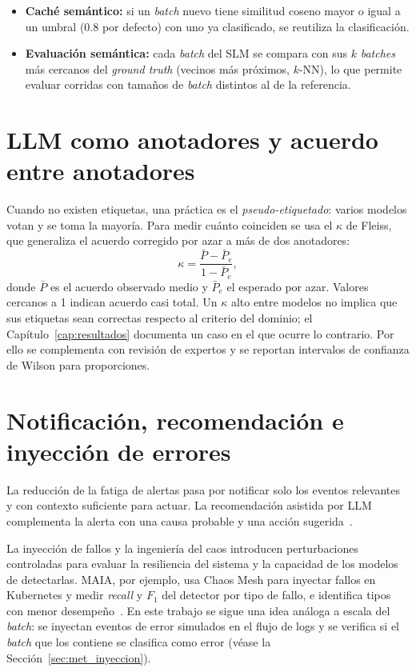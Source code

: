 \begin{itemize}
  \item \textbf{Caché semántico:} si un \textit{batch} nuevo tiene similitud coseno mayor o igual a un umbral (0.8 por defecto) con uno ya clasificado, se reutiliza la clasificación.
  \item \textbf{Evaluación semántica:} cada \textit{batch} del SLM se compara con sus $k$ \textit{batches} más cercanos del \textit{ground truth} (vecinos más próximos, $k$-NN), lo que permite evaluar corridas con tamaños de \textit{batch} distintos al de la referencia.
\end{itemize}

\section{LLM como anotadores y acuerdo entre anotadores}\label{sec:mt_anotacion}

Cuando no existen etiquetas, una práctica es el \textit{pseudo-etiquetado}: varios modelos votan y se toma la mayoría. Para medir cuánto coinciden se usa el $\kappa$ de Fleiss, que generaliza el acuerdo corregido por azar a más de dos anotadores:
\begin{equation}
\kappa = \frac{\bar{P} - \bar{P}_e}{1 - \bar{P}_e},
\end{equation}
donde $\bar{P}$ es el acuerdo observado medio y $\bar{P}_e$ el esperado por azar. Valores cercanos a 1 indican acuerdo casi total. %
Un $\kappa$ alto entre modelos no implica que sus etiquetas sean correctas respecto al criterio del dominio; el Capítulo~\ref{cap:resultados} documenta un caso en el que ocurre lo contrario. Por ello se complementa con revisión de expertos y se reportan intervalos de confianza de Wilson para proporciones.

\section{Notificación, recomendación e inyección de errores}\label{sec:mt_reaccion}

La reducción de la fatiga de alertas pasa por notificar solo los eventos relevantes y con contexto suficiente para actuar. La recomendación asistida por LLM complementa la alerta con una causa probable y una acción sugerida~\cite{pedroso2025_maia}. %

La inyección de fallos y la ingeniería del caos introducen perturbaciones controladas para evaluar la resiliencia del sistema y la capacidad de los modelos de detectarlas. MAIA, por ejemplo, usa Chaos Mesh para inyectar fallos en Kubernetes y medir \textit{recall} y $F_1$ del detector por tipo de fallo, e identifica tipos con menor desempeño~\cite{pedroso2025_maia}. En este trabajo se sigue una idea análoga a escala del \textit{batch}: se inyectan eventos de error simulados en el flujo de logs y se verifica si el \textit{batch} que los contiene se clasifica como error (véase la Sección~\ref{sec:met_inyeccion}).
